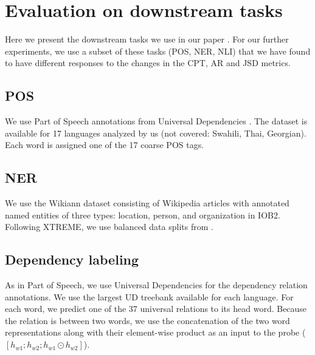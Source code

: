



\section{Evaluation on downstream tasks}

Here we present the downstream tasks we use in our paper \cite{limisiewicz_tokenization_2023}. For our further experiments, we use a subset of these tasks (POS, NER, NLI) that we have found to have different responses to the changes in the CPT, AR and JSD metrics.

\subsection{POS}

We use Part of Speech annotations from Universal Dependencies \cite{nivre_universal_2020}. The dataset is available for 17 languages analyzed by us (not covered: Swahili, Thai, Georgian). Each word is assigned one of the 17 coarse POS tags.

\subsection{NER}

We use the Wikiann dataset \cite{pan_cross-lingual_2017} consisting of Wikipedia articles with annotated named entities of three types: location, person, and organization in IOB2. Following XTREME, we use balanced data splits from \cite{rahimi_massively_2019}.

\subsection{Dependency labeling}

As in Part of Speech, we use Universal Dependencies \cite{nivre_universal_2020} for the dependency relation annotations. We use the largest UD treebank available for each language.
For each word, we predict one of the 37 universal relations to its head word. Because the relation is between two words, we use the concatenation of the two word representations along with their element-wise product as an input to the probe ($[h_{w1}; h_{w2}; h_{w1} \odot h_{w2}]$).

